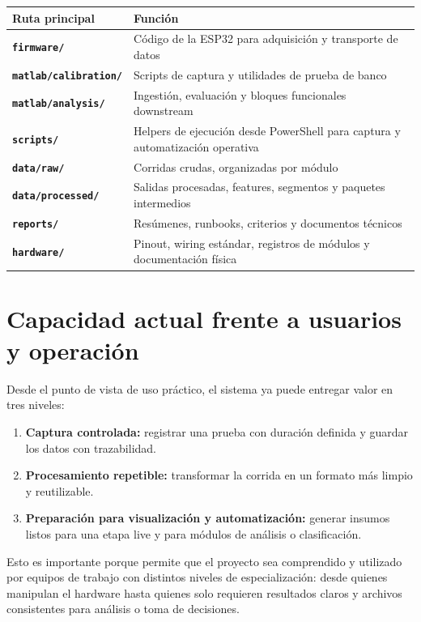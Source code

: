 \documentclass[11pt,a4paper]{article}
\begin{document}
\begin{center}
\renewcommand{\arraystretch}{1.3}
\begin{tabularx}{\textwidth}{>{\bfseries}p{3.7cm}X}
\toprule
Ruta principal & Función \\
\midrule
\texttt{firmware/} & Código de la ESP32 para adquisición y transporte de datos \\
\texttt{matlab/calibration/} & Scripts de captura y utilidades de prueba de banco \\
\texttt{matlab/analysis/} & Ingestión, evaluación y bloques funcionales downstream \\
\texttt{scripts/} & Helpers de ejecución desde PowerShell para captura y automatización operativa \\
\texttt{data/raw/} & Corridas crudas, organizadas por módulo \\
\texttt{data/processed/} & Salidas procesadas, features, segmentos y paquetes intermedios \\
\texttt{reports/} & Resúmenes, runbooks, criterios y documentos técnicos \\
\texttt{hardware/} & Pinout, wiring estándar, registros de módulos y documentación física \\
\bottomrule
\end{tabularx}
\end{center}

\section{Capacidad actual frente a usuarios y operación}

Desde el punto de vista de uso práctico, el sistema ya puede entregar valor en tres niveles:

\begin{enumerate}
  \item \textbf{Captura controlada:} registrar una prueba con duración definida y guardar los datos con trazabilidad.
  \item \textbf{Procesamiento repetible:} transformar la corrida en un formato más limpio y reutilizable.
  \item \textbf{Preparación para visualización y automatización:} generar insumos listos para una etapa live y para módulos de análisis o clasificación.
\end{enumerate}

Esto es importante porque permite que el proyecto sea comprendido y utilizado por equipos de trabajo con distintos niveles de especialización: desde quienes manipulan el hardware hasta quienes solo requieren resultados claros y archivos consistentes para análisis o toma de decisiones.
\end{document}
